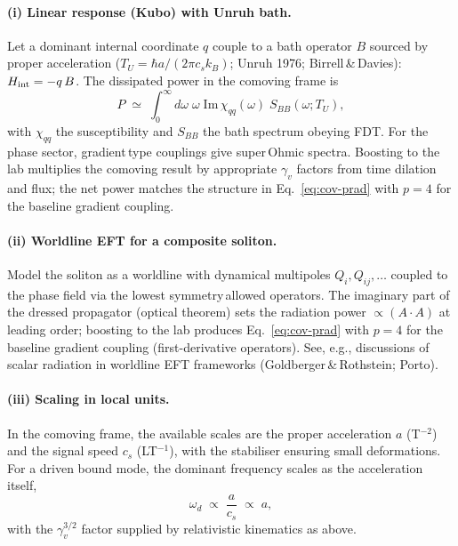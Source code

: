 \documentclass[11pt]{article}
\begin{document}
\paragraph{(i) Linear response (Kubo) with Unruh bath.} Let a dominant internal coordinate $q$ couple to a bath operator $B$ sourced by proper acceleration ($T_U=\hbar a/(2\pi c_s k_B)$; Unruh 1976; Birrell\,\&\,Davies): $H_{\rm int}=-q\,B$. The dissipated power in the comoving frame is
\begin{equation}
  P \;\simeq\; \int_0^{\infty}\! d\omega\; \omega\; \mathrm{Im}\,\chi_{qq}(\omega)\; S_{BB}(\omega;T_U),
\end{equation}
with $\chi_{qq}$ the susceptibility and $S_{BB}$ the bath spectrum obeying FDT. For the phase sector, gradient\,type couplings give super\,Ohmic spectra. Boosting to the lab multiplies the comoving result by appropriate $\gamma_v$ factors from time dilation and flux; the net power matches the structure in Eq.~\eqref{eq:cov-prad} with $p=4$ for the baseline gradient coupling.

\paragraph{(ii) Worldline EFT for a composite soliton.} Model the soliton as a worldline with dynamical multipoles $Q_i, Q_{ij},\dots$ coupled to the phase field via the lowest symmetry\,allowed operators. The imaginary part of the dressed propagator (optical theorem) sets the radiation power $\propto (A\!\cdot\!A)$ at leading order; boosting to the lab produces Eq.~\eqref{eq:cov-prad} with $p=4$ for the baseline gradient coupling (first-derivative operators). See, e.g., discussions of scalar radiation in worldline EFT frameworks (Goldberger\,\&\,Rothstein; Porto).

\paragraph{(iii) Scaling in local units.} In the comoving frame, the available scales are the proper acceleration $a$ (T$^{-2}$) and the signal speed $c_s$ (LT$^{-1}$), with the stabiliser ensuring small deformations. For a driven bound mode, the dominant frequency scales as the acceleration itself,
\begin{equation}
  \omega_d \;\propto\; \frac{a}{c_s} \;\propto\; a,
\end{equation}
with the $\gamma_v^{3/2}$ factor supplied by relativistic kinematics as above.
\end{document}
